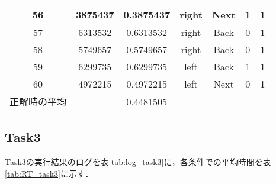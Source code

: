 \documentclass{jlreq}
\numberwithin{equation}{section}
\begin{document}
\begin{table}[H]
{\begin{tabular}{|c|c|c|c|c|c|c|}
      56           & 3875437          & 0.3875437      & right     & Next & 1     & 1   \\ \hline
      57           & 6313532          & 0.6313532      & right     & Back & 0     & 1   \\ \hline
      58           & 5749657          & 0.5749657      & right     & Back & 0     & 1   \\ \hline
      59           & 6299735          & 0.6299735      & left      & Back & 1     & 1   \\ \hline
      60           & 4972215          & 0.4972215      & left      & Next & 0     & 1   \\ \hline
      正解時の平均 & ~                & 0.4481505      & ~         & ~    & ~     & ~   \\ \hline
    \end{tabular}}
  \label{tab:log_task2}
\end{table}

\begin{table}[H]
  \centering
  \caption{Task2における，条件毎の平均反応時間}
  \label{tab:RT_task2}
\end{table}

\subsection{Task3}

Task3の実行結果のログを表\ref{tab:log_task3}に，各条件での平均時間を表\ref{tab:RT_task3}に示す．
\end{document}
